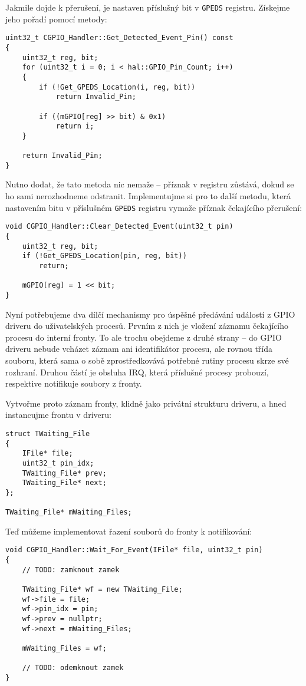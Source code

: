 \documentclass{article}
\begin{document}
Jakmile dojde k přerušení, je nastaven příslušný bit v \texttt{GPEDS} registru. Získejme jeho pořadí pomocí metody:
\begin{lstlisting}
uint32_t CGPIO_Handler::Get_Detected_Event_Pin() const
{
	uint32_t reg, bit;
	for (uint32_t i = 0; i < hal::GPIO_Pin_Count; i++)
	{
		if (!Get_GPEDS_Location(i, reg, bit))
			return Invalid_Pin;
		
		if ((mGPIO[reg] >> bit) & 0x1)
			return i;
	}
	
	return Invalid_Pin;
}
\end{lstlisting}
Nutno dodat, že tato metoda nic nemaže -- příznak v registru zůstává, dokud se ho sami nerozhodneme odstranit. Implementujme si pro to další metodu, která nastavením bitu v příslušném \texttt{GPEDS} registru vymaže příznak čekajícího přerušení:
\begin{lstlisting}
void CGPIO_Handler::Clear_Detected_Event(uint32_t pin)
{
	uint32_t reg, bit;
	if (!Get_GPEDS_Location(pin, reg, bit))
		return;

	mGPIO[reg] = 1 << bit;
}
\end{lstlisting}

Nyní potřebujeme dva dílčí mechanismy pro úspěšné předávání událostí z GPIO driveru do uživatelských procesů. Prvním z nich je vložení záznamu čekajícího procesu do interní fronty. To ale trochu obejdeme z druhé strany -- do GPIO driveru nebude vcházet záznam ani identifikátor procesu, ale rovnou třída souboru, která sama o sobě zprostředkovává potřebné rutiny procesu skrze své rozhraní. Druhou částí je obsluha IRQ, která příslušné procesy probouzí, respektive notifikuje soubory z fronty.

Vytvořme proto záznam fronty, klidně jako privátní strukturu driveru, a hned instancujme frontu v driveru:
\begin{lstlisting}
struct TWaiting_File
{
	IFile* file;
	uint32_t pin_idx;
	TWaiting_File* prev;
	TWaiting_File* next;
};

TWaiting_File* mWaiting_Files;
\end{lstlisting}

Teď můžeme implementovat řazení souborů do fronty k notifikování:
\begin{lstlisting}
void CGPIO_Handler::Wait_For_Event(IFile* file, uint32_t pin)
{
	// TODO: zamknout zamek
	
	TWaiting_File* wf = new TWaiting_File;
	wf->file = file;
	wf->pin_idx = pin;
	wf->prev = nullptr;
	wf->next = mWaiting_Files;
	
	mWaiting_Files = wf;
	
	// TODO: odemknout zamek
}
\end{lstlisting}
\end{document}
